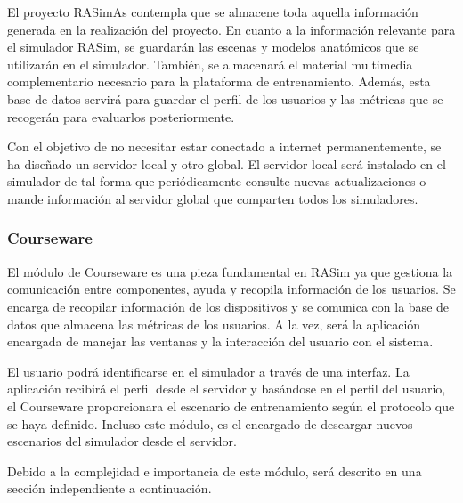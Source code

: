 El proyecto \ac{RASimAs} contempla que se almacene toda aquella información generada en la realización del proyecto. En cuanto a la información relevante para el simulador \ac{RASim}, se guardarán las escenas y modelos anatómicos que se utilizarán en el simulador. También, se almacenará el material multimedia complementario necesario para la plataforma de entrenamiento. Además, esta base de datos servirá para guardar el perfil de los usuarios y las métricas que se recogerán para evaluarlos posteriormente.

Con el objetivo de no necesitar estar conectado a internet permanentemente, se ha diseñado un servidor local y otro global. El servidor local será instalado en el simulador de tal forma que periódicamente consulte nuevas actualizaciones o mande información al servidor global que comparten todos los simuladores.

\subsubsection{Courseware}


El módulo de \ac{Courseware} es una pieza fundamental en \ac{RASim} ya que gestiona la comunicación entre componentes, ayuda y recopila información de los usuarios. Se encarga de recopilar información de los dispositivos y se comunica con la base de datos que almacena las métricas de los usuarios. A la vez, será la aplicación encargada de manejar las ventanas y la interacción del usuario con el sistema. 

El usuario podrá identificarse en el simulador a través de una interfaz. La aplicación recibirá el perfil desde el servidor y basándose en el perfil del usuario, el \ac{Courseware} proporcionara el escenario de entrenamiento según el protocolo que se haya definido. Incluso este módulo, es el encargado de descargar nuevos escenarios del simulador desde el servidor. 

Debido a la complejidad e importancia de este módulo, será descrito en una sección independiente a continuación.


